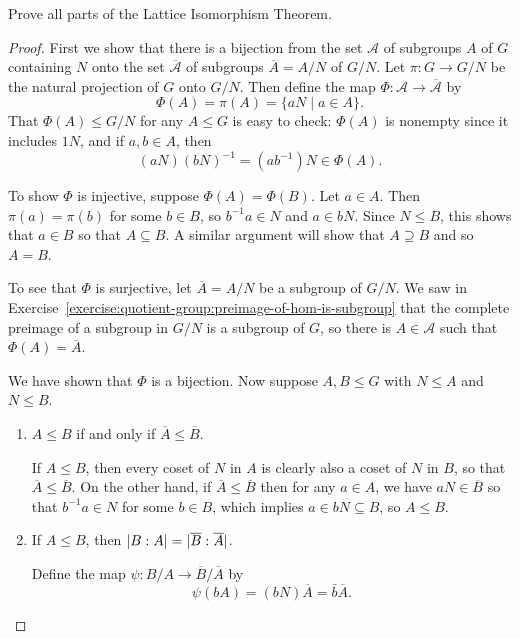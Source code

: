  Prove all parts of the Lattice Isomorphism Theorem.
\begin{proof}
  First we show that there is a bijection from the set $\mathcal{A}$
  of subgroups $A$ of $G$ containing $N$ onto the set
  $\overline{\mathcal{A}}$ of subgroups $\overline{A} = A/N$ of
  $G/N$. Let $\pi\colon G\to G/N$ be the natural projection of $G$
  onto $G/N$. Then define the map
  $\Phi\colon\mathcal{A}\to\overline{\mathcal{A}}$ by
  \begin{equation*}
    \Phi(A) = \pi(A) = \{aN \mid a\in A\}.
  \end{equation*}
  That $\Phi(A)\leq G/N$ for any $A\leq G$ is easy to check: $\Phi(A)$
  is nonempty since it includes $1N$, and if $a,b\in A$, then
  \begin{equation*}
    (aN)(bN)^{-1} = (ab^{-1})N\in\Phi(A).
  \end{equation*}

  To show $\Phi$ is injective, suppose $\Phi(A) = \Phi(B)$. Let
  $a\in A$. Then $\pi(a) = \pi(b)$ for some $b\in B$, so
  $b^{-1}a\in N$ and $a\in bN$. Since $N\leq B$, this shows that
  $a\in B$ so that $A\subseteq B$. A similar argument will show that
  $A\supseteq B$ and so $A = B$.

  To see that $\Phi$ is surjective, let $\overline{A} = A/N$ be a
  subgroup of $G/N$. We saw in
  Exercise~\ref{exercise:quotient-group:preimage-of-hom-is-subgroup}
  that the complete preimage of a subgroup in $G/N$ is a subgroup of
  $G$, so there is $A\in\mathcal{A}$ such that
  $\Phi(A) = \overline{A}$.

  We have shown that $\Phi$ is a bijection. Now suppose $A,B\leq G$
  with $N\leq A$ and $N\leq B$.
  \begin{enumerate}
  \item $A\leq B$ if and only if $\overline{A}\leq\overline{B}$.

    If $A\leq B$, then every coset of $N$ in $A$ is clearly also a
    coset of $N$ in $B$, so that $\overline{A}\leq\overline{B}$. On
    the other hand, if $\overline{A}\leq\overline{B}$ then for any
    $a\in A$, we have $aN\in\overline{B}$ so that $b^{-1}a\in N$ for
    some $b\in B$, which implies $a\in bN\subseteq B$, so $A\leq B$.
  \item If $A\leq B$, then
    $\lvert{B:A}\rvert = \lvert{\overline{B}:\overline{A}}\rvert$.

    Define the map $\psi\colon B/A\to\overline{B}/\overline{A}$ by
    \begin{equation*}
      \psi(bA) = (bN)\overline{A} = \bar{b}\overline{A}.
    \end{equation*}


\end{enumerate}
\end{proof}

